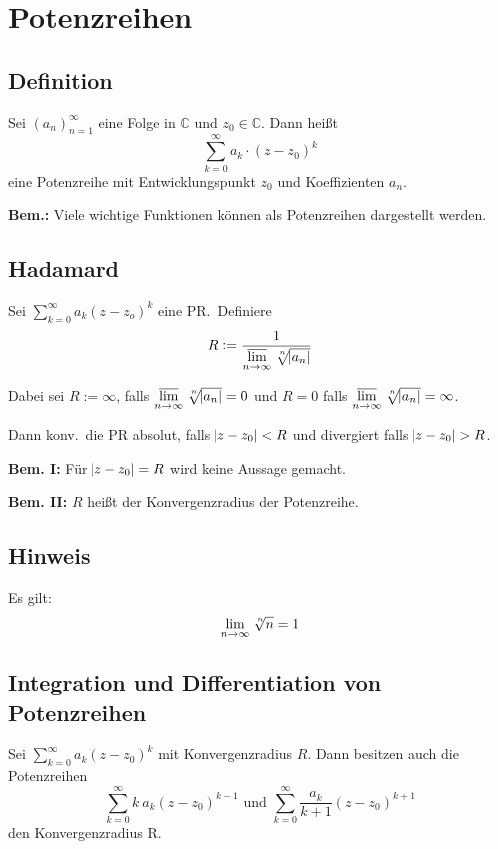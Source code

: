 \documentclass[10pt]{article}
\newcommand{\C}{\mathbb{C}}
\newcommand{\an}{{(a_n)}_{n=1}^\infty}
\newcommand*{\nthSqrt}[2]{\sqrt[\leftroot{-2}\uproot{2}#1]{#2}}
\begin{document}
    \section{Potenzreihen}

    \subsection{Definition}
    Sei $\an$ eine Folge in $\C$ und $z_0 \in \C$. Dann heißt
    \begin{equation*}
        \sum_{k=0}^\infty a_k \cdot {(z - z_0)}^k
    \end{equation*}
    eine Potenzreihe mit Entwicklungspunkt $z_0$ und Koeffizienten
    $a_n$.

    \textbf{Bem.:} Viele wichtige Funktionen können als Potenzreihen dargestellt
    werden.

    \subsection{Hadamard}
    Sei $\sum_{k=0}^\infty a_k {(z-z_o)}^k$ eine PR.\ Definiere
    \begin{equation*}
        R := \frac{1}{\varlimsup\limits_{n \rightarrow \infty} \nthSqrt{n}{\abs{a_n}}}
    \end{equation*}

    Dabei sei $R:=\infty$, falls
    $\varlimsup\limits_{n \rightarrow \infty} \nthSqrt{n}{\abs{a_n}} = 0$ und
    $R=0$ falls
    $\varlimsup\limits_{n \rightarrow \infty} \nthSqrt{n}{\abs{a_n}} = \infty$.

    Dann konv.\ die PR absolut, falls $\abs{z - z_0} < R$ und divergiert falls
    $\abs{z - z_0} > R$.

    \textbf{Bem. I:} Für $\abs{z - z_0} = R$ wird keine Aussage gemacht.

    \textbf{Bem. II:} $R$ heißt der Konvergenzradius der Potenzreihe.

    \subsection{Hinweis}
    Es gilt:
    \begin{equation*}
        \lim_{n \rightarrow \infty} \nthSqrt{n}{n} = 1
    \end{equation*}

    \subsection{Integration und Differentiation von Potenzreihen}
    Sei $\sum_{k=0}^\infty a_k {(z - z_0)}^k$ mit Konvergenzradius $R$. Dann besitzen
    auch die Potenzreihen
    \begin{equation*}
        \sum_{k=0}^\infty k\: a_k {(z - z_0)}^{k-1} \text{ und }
        \sum_{k=0}^\infty \frac{a_k}{k+1} {(z-z_0)}^{k+1}
    \end{equation*}
    den Konvergenzradius R.
\end{document}
